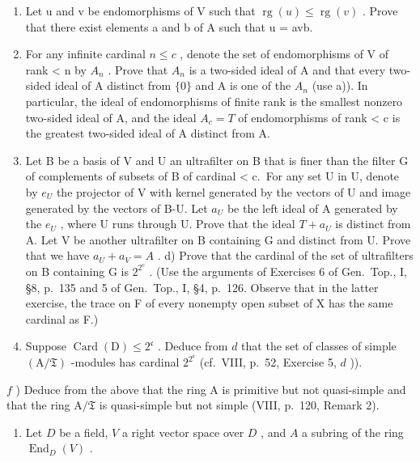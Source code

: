\begin{enumerate}
\def\labelenumi{\alph{enumi})}
\item
  Let u and v be endomorphisms of V such that \(\operatorname{rg}(u) \leqslant \operatorname{rg}(v)\) . Prove that there exist elements a and b of A such that u = avb.
\item
  For any infinite cardinal \(n \leqslant c\) , denote the set of endomorphisms of V of rank \textless{} n by \(A_{n}\) . Prove that \(A_{n}\) is a two-sided ideal of A and that every two-sided ideal of A distinct from \(\{0\}\) and A is one of the \(A_{n}\) (use a)). In particular, the ideal of endomorphisms of finite rank is the smallest nonzero two-sided ideal of A, and the ideal \(A_{c} = T\) of endomorphisms of rank \textless{} c is the greatest two-sided ideal of A distinct from A.
\item
  Let B be a basis of V and U an ultrafilter on B that is finer than the filter G of complements of subsets of B of cardinal \textless{} c.~For any set U in U, denote by \(e_{U}\) the projector of V with kernel generated by the vectors of U and image generated by the vectors of B-U. Let \(a_{U}\) be the left ideal of A generated by the \(e_{U}\) , where U runs through U. Prove that the ideal \(T + a_{U}\) is distinct from A. Let V be another ultrafilter on B containing G and distinct from U. Prove that we have \(a_{U} + a_{V} = A\) . d) Prove that the cardinal of the set of ultrafilters on B containing G is \(2^{2^{c}}\) . (Use the arguments of Exercises 6 of Gen.~Top., I, §8, p.~135 and 5 of Gen.~Top., I, §4, p.~126. Observe that in the latter exercise, the trace on F of every nonempty open subset of X has the same cardinal as F.)
\item
  Suppose \(\operatorname{Card}(\mathrm{D}) \leqslant 2^{\mathfrak{c}}\) . Deduce from \(d\) that the set of classes of simple \((\mathrm{A} / \mathfrak{T})\) -modules has cardinal \(2^{2^{\mathfrak{c}}}\) (cf.~VIII, p.~52, Exercise 5, \(d\) )).
\end{enumerate}

\(f\) ) Deduce from the above that the ring A is primitive but not quasi-simple and that the ring \(\mathrm{A} / \mathfrak{T}\) is quasi-simple but not simple (VIII, p.~120, Remark 2).

\begin{enumerate}
\def\labelenumi{\arabic{enumi})}
\setcounter{enumi}{2}
\tightlist
\item
  Let \(D\) be a field, \(V\) a right vector space over \(D\) , and \(A\) a subring of the ring \(\operatorname{End}_D(V)\) .
\end{enumerate}

